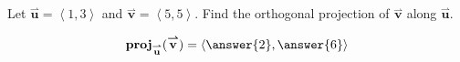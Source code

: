 \documentclass{ximera}
\author{Gregory Hartman \and Matthew Carr}
\begin{document}
\begin{exercise}
Let $\overset{\boldsymbol{\rightharpoonup}}{\mathbf{u}} = \left< 1,3 \right>$ and $\overset{\boldsymbol{\rightharpoonup}}{\mathbf{v}} = \left< 5,5 \right>$. Find the
orthogonal projection of $\overset{\boldsymbol{\rightharpoonup}}{\mathbf{v}}$ along $\overset{\boldsymbol{\rightharpoonup}}{\mathbf{u}}$.
\begin{prompt}
\[
\mathbf{proj}_{\overset{\boldsymbol{\rightharpoonup}}{\mathbf{u}}}(\overset{\boldsymbol{\rightharpoonup}}{\mathbf{v}})= \left< \answer{2},\answer{6} \right>
\]
\end{prompt}
\end{exercise}
\end{document}
